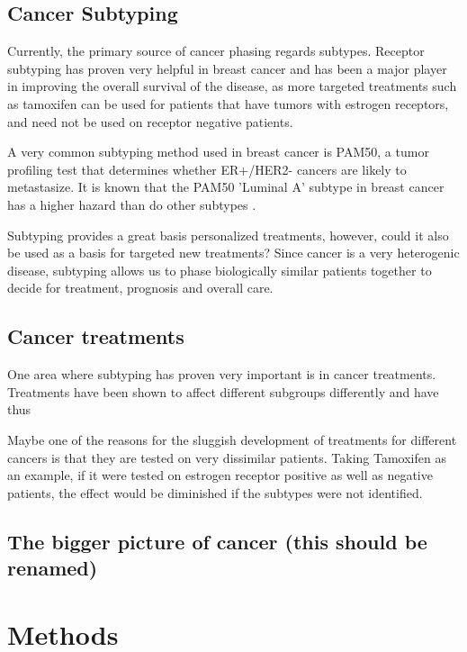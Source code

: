 \documentclass{kththesis}
\begin{document}
    \section{Cancer Subtyping}
    Currently, the primary source of cancer phasing regards subtypes. Receptor subtyping has proven very helpful in breast cancer and has been a major player in improving the overall survival of the disease, as more targeted treatments such as tamoxifen can be used for patients that have tumors with estrogen receptors, and need not be used on receptor negative patients.

    A very common subtyping method used in breast cancer is PAM50, a tumor profiling test that determines whether ER+/HER2- cancers are likely to metastasize. It is known that the PAM50 'Luminal A' subtype in breast cancer has a higher hazard than do other subtypes \cite{RN57}.

    Subtyping provides a great basis personalized treatments, however, could it also be used as a basis for targeted new treatments? Since cancer is a very heterogenic disease, subtyping allows us to phase biologically similar patients together to decide for treatment, prognosis and overall care.


    \section{Cancer treatments}
    One area where subtyping has proven very important is in cancer treatments. Treatments have been shown to affect different subgroups differently and have thus



    Maybe one of the reasons for the sluggish development of treatments for different cancers is that they are tested on very dissimilar patients. Taking Tamoxifen as an example, if it were tested on estrogen receptor positive as well as negative patients, the effect would be diminished if the subtypes were not identified.

    \section{The bigger picture of cancer (this should be renamed)}




    \section{}


\chapter{Methods}
\end{document}
